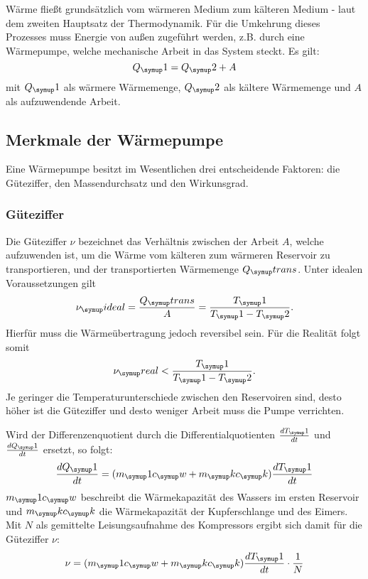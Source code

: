 Wärme fließt grundsätzlich vom wärmeren Medium zum kälteren Medium - laut dem
zweiten Hauptsatz der Thermodynamik. Für die Umkehrung dieses Prozesses muss
Energie von außen zugeführt werden, z.B. durch eine Wärmepumpe, welche mechanische
Arbeit in das System steckt. Es gilt:
\begin{equation}
  Q_\su{1} = Q_\su{2} + A
\end{equation}
mit $Q_\su{1}$ als wärmere Wärmemenge, $Q_\su{2}$ als kältere Wärmemenge und $A$ als
aufzuwendende Arbeit.
\subsection{Merkmale der Wärmepumpe}
Eine Wärmepumpe besitzt im Wesentlichen drei entscheidende Faktoren: die Güteziffer,
den Massendurchsatz und den Wirkunsgrad.
\subsubsection{Güteziffer}
Die Güteziffer $\nu$ bezeichnet das Verhältnis zwischen der Arbeit $A$, welche aufzuwenden
ist, um die Wärme vom kälteren zum wärmeren Reservoir zu transportieren, und der
transportierten Wärmemenge $Q_\su{trans}$. Unter idealen Voraussetzungen gilt
\begin{equation}
      \nu_\su{ideal} = \frac{Q_\su{trans}}{A} = \frac{T_\su{1}}{T_\su{1}-T_\su{2}}.
\end{equation}
Hierfür muss die Wärmeübertragung jedoch reversibel sein. Für die Realität folgt
somit
\begin{equation}
  \nu_\su{real} < \frac{T_\su{1}}{T_\su{1}-T_\su{2}}.
\end{equation}
Je geringer die Temperaturunterschiede zwischen den Reservoiren sind, desto höher ist
die Güteziffer und desto weniger Arbeit muss die Pumpe verrichten.

Wird der Differenzenquotient durch die Differentialquotienten $\frac{dT_\su{1}}{dt}$
und $\frac{dQ_\su{1}}{dt}$ ersetzt, so folgt:
\begin{equation}
  \frac{dQ_\su{1}}{dt}= (m_\su{1}c_\su{w}+m_\su{k}c_\su{k})\frac{dT_\su{1}}{dt}
\end{equation}
$m_\su{1}c_\su{w}$ beschreibt die Wärmekapazität des Wassers im ersten Reservoir und
$m_\su{k}c_\su{k}$ die Wärmekapazität der Kupferschlange und des Eimers. Mit $N$
als gemittelte Leisungsaufnahme des Kompressors ergibt sich damit für die Güteziffer
$\nu$:
\begin{equation}
  \nu = (m_\su{1}c_\su{w}+m_\su{k}c_\su{k})\frac{dT_\su{1}}{dt} \cdot \frac{1}{N}
  \label{eqn:güte}
\end{equation}
